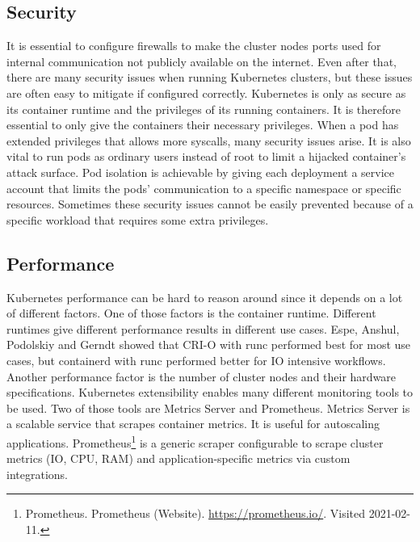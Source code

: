 \subsection{Security}
It is essential to configure firewalls to make the cluster nodes ports used for internal communication not publicly available on the internet\cite{k8s_docs}. Even after that, there are many security issues when running Kubernetes clusters, but these issues are often easy to mitigate if configured correctly. Kubernetes is only as secure as its container runtime and the privileges of its running containers. It is therefore essential to only give the containers their necessary privileges. When a pod has extended privileges that allows more syscalls, many security issues arise. It is also vital to run pods as ordinary users instead of root to limit a hijacked container's attack surface. Pod isolation is achievable by giving each deployment a service account that limits the pods' communication to a specific namespace or specific resources. Sometimes these security issues cannot be easily prevented because of a specific workload that requires some extra privileges. 
\subsection{Performance}
Kubernetes performance can be hard to reason around since it depends on a lot of different factors\cite{k8s_docs}. One of those factors is the container runtime. Different runtimes give different performance results in different use cases. Espe, Anshul, Podolskiy and Gerndt\cite{container_runtimes} showed that CRI-O with runc performed best for most use cases, but containerd with runc performed better for IO intensive workflows. Another performance factor is the number of cluster nodes and their hardware specifications. Kubernetes extensibility enables many different monitoring tools to be used. Two of those tools are Metrics Server and Prometheus. Metrics Server is a scalable service that scrapes container metrics. It is useful for autoscaling applications. Prometheus\footnote{Prometheus. Prometheus (Website). \url{https://prometheus.io/}. Visited 2021-02-11.} is a generic scraper configurable to scrape cluster metrics (IO, CPU, RAM) and application-specific metrics via custom integrations. 
